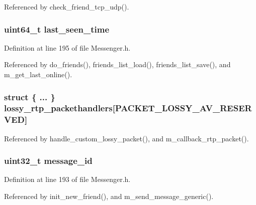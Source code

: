 Referenced by check\+\_\+friend\+\_\+tcp\+\_\+udp().

\hypertarget{struct_friend_a8f99c48eb6b3ea472806495135ab6792}{
\subsubsection[{last\+\_\+seen\+\_\+time}]{\setlength{\rightskip}{0pt plus 5cm}uint64\+\_\+t last\+\_\+seen\+\_\+time}}\label{struct_friend_a8f99c48eb6b3ea472806495135ab6792}


Definition at line 195 of file Messenger.\+h.



Referenced by do\+\_\+friends(), friends\+\_\+list\+\_\+load(), friends\+\_\+list\+\_\+save(), and m\+\_\+get\+\_\+last\+\_\+online().

\hypertarget{struct_friend_af8c513c69f17fc044615b18ec03f9911}{
\subsubsection[{lossy\+\_\+rtp\+\_\+packethandlers}]{\setlength{\rightskip}{0pt plus 5cm}struct \{ ... \}   lossy\+\_\+rtp\+\_\+packethandlers\mbox{[}{\bf P\+A\+C\+K\+E\+T\+\_\+\+L\+O\+S\+S\+Y\+\_\+\+A\+V\+\_\+\+R\+E\+S\+E\+R\+V\+E\+D}\mbox{]}}}\label{struct_friend_af8c513c69f17fc044615b18ec03f9911}


Referenced by handle\+\_\+custom\+\_\+lossy\+\_\+packet(), and m\+\_\+callback\+\_\+rtp\+\_\+packet().

\hypertarget{struct_friend_aa4420a99dd00b4884b23150e4226b2ea}{
\subsubsection[{message\+\_\+id}]{\setlength{\rightskip}{0pt plus 5cm}uint32\+\_\+t message\+\_\+id}}\label{struct_friend_aa4420a99dd00b4884b23150e4226b2ea}


Definition at line 193 of file Messenger.\+h.



Referenced by init\+\_\+new\+\_\+friend(), and m\+\_\+send\+\_\+message\+\_\+generic().

